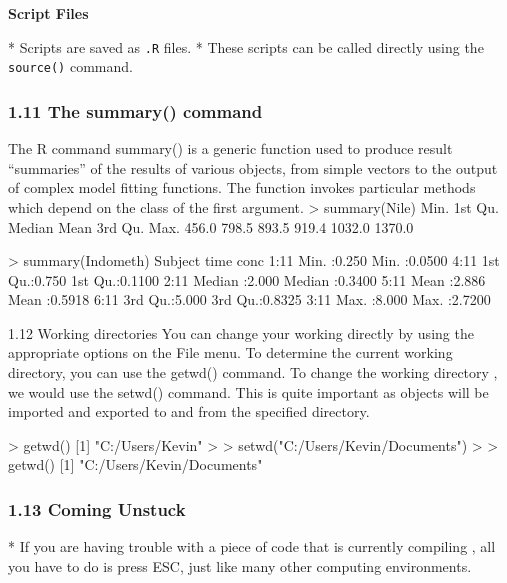  
 
 
 \textbf{Script Files}
 
*  Scripts are saved as \texttt{.R} files. 
*  These scripts can be called directly using the \texttt{source()} command.

 
 
 
 
 \frametitle{1.11 The summary() command}
 The R command summary() is a generic function used to produce result “summaries” of the
 results of various objects, from simple vectors to the output of complex model fitting functions.
 The function invokes particular methods which depend on the class of the first argument.
 > summary(Nile)
 Min. 1st Qu. Median Mean 3rd Qu. Max.
 456.0 798.5 893.5 919.4 1032.0 1370.0
 
 
 > summary(Indometh)
 Subject time conc
 1:11 Min. :0.250 Min. :0.0500
 4:11 1st Qu.:0.750 1st Qu.:0.1100
 2:11 Median :2.000 Median :0.3400
 5:11 Mean :2.886 Mean :0.5918
 6:11 3rd Qu.:5.000 3rd Qu.:0.8325
 3:11 Max. :8.000 Max. :2.7200
 
 
 1.12 Working directories
 You can change your working directly by using the appropriate options on the File menu. To
 determine the current working directory, you can use the getwd() command. To change the
 working directory , we would use the setwd() command. This is quite important as objects
 will be imported and exported to and from the specified directory.
 
 
 > getwd()
 [1] "C:/Users/Kevin"
 >
 > setwd("C:/Users/Kevin/Documents")
 >
 > getwd()
 [1] "C:/Users/Kevin/Documents"
 
 
 \frametitle{1.13 Coming Unstuck}
 
 
* If you are having trouble with a piece of code that is currently compiling , all you have to do is press ESC, just like many other computing environments.

